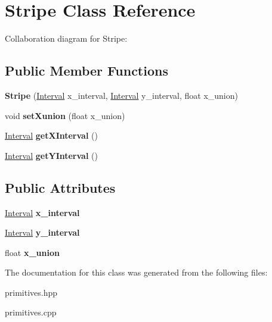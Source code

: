 \hypertarget{classStripe}{}\section{Stripe Class Reference}
\label{classStripe}


Collaboration diagram for Stripe\+:
\subsection*{Public Member Functions}
\begin{DoxyCompactItemize}
\item 
\mbox{\label{classStripe_a9b6052e4c76194fca4805c63a8c9334b}} 
{\bfseries Stripe} (\hyperlink{classInterval}{Interval} x\+\_\+interval, \hyperlink{classInterval}{Interval} y\+\_\+interval, float x\+\_\+union)
\item 
\mbox{\label{classStripe_a306bdc2d48b64b1d8ba45c4f86faf6a2}} 
void {\bfseries set\+Xunion} (float x\+\_\+union)
\item 
\mbox{\label{classStripe_ac29118cb6f4d6f8b684f39bbb1d550cb}} 
\hyperlink{classInterval}{Interval} {\bfseries get\+X\+Interval} ()
\item 
\mbox{\label{classStripe_a9fa20f20b1ae8fba317967418f98dd51}} 
\hyperlink{classInterval}{Interval} {\bfseries get\+Y\+Interval} ()
\end{DoxyCompactItemize}
\subsection*{Public Attributes}
\begin{DoxyCompactItemize}
\item 
\mbox{\label{classStripe_a7b0334259196ee093d8144c301ac8b2d}} 
\hyperlink{classInterval}{Interval} {\bfseries x\+\_\+interval}
\item 
\mbox{\label{classStripe_a503fd91504497fa99df8f0c86067476b}} 
\hyperlink{classInterval}{Interval} {\bfseries y\+\_\+interval}
\item 
\mbox{\label{classStripe_a9f570334815593db7f757e43e72f567c}} 
float {\bfseries x\+\_\+union}
\end{DoxyCompactItemize}


The documentation for this class was generated from the following files\+:\begin{DoxyCompactItemize}
\item 
primitives.\+hpp\item 
primitives.\+cpp\end{DoxyCompactItemize}

